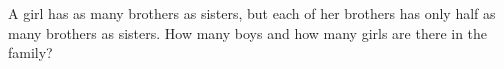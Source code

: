 A girl has as many brothers as sisters, but each of her brothers has only half as many brothers as sisters. How many boys and how many girls are there in the family?
